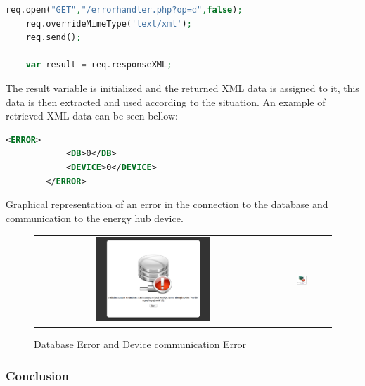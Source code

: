 \begin{lstlisting}[language=php]
	req.open("GET","/errorhandler.php?op=d",false);
	req.overrideMimeType('text/xml');
	req.send();
	
	var result = req.responseXML;
\end{lstlisting}

The result variable is initialized and the returned XML data is assigned to it, this data is then extracted and used according to the situation. An example of retrieved XML data can be seen bellow:

\begin{lstlisting}[language=xml]
		<ERROR>
			<DB>0</DB>
			<DEVICE>0</DEVICE>
		</ERROR>
\end{lstlisting}

%

Graphical representation of an error in the connection to the database and communication to the energy hub device.
\begin{figure}[H]
	\begin{tabular}{ c c }
		\includegraphics[width=0.5\textwidth]{images/error_db.png}
&
		\includegraphics[width=0.2\textwidth]{images/error_device.png}
\end{tabular}
\caption{Database Error and Device communication Error}
\end{figure} 

\subsubsection{Conclusion}

